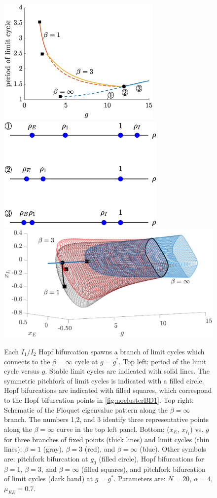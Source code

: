 \documentclass[reqno]{siamonline190516}
\begin{document}
\begin{figure}
    \centering
    \includegraphics[width=8cm]{periodvsg.eps}
    \includegraphics[width=8.2cm]{floquet1.eps}\\
    \hspace{-1cm}
    \includegraphics[width=17.25cm]{pitchbif.eps}
    \caption{Each $I_1/I_2$ Hopf bifurcation spawns a branch of limit cycles which connects to the $\beta=\infty$ cycle at $g=g^*$. Top left: period of the limit cycle versus $g$. Stable limit cycles are indicated with solid lines. The symmetric pitchfork of limit cycles is indicated with a filled circle. Hopf bifurcations are indicated with filled squares, which correspond to the Hopf bifurcation points in \cref{fig:noclusterBD1}. Top right: Schematic of the Floquet eigenvalue pattern along the $\beta = \infty$ branch. The numbers 1,2, and 3 identify three representative points along the $\beta=\infty$ curve in the top left panel. Bottom: ($x_E$, $x_{I_1}$) vs. $g$ for three branches of fixed points (thick lines) and limit cycles (thin lines): $\beta = 1$ (gray), $\beta=3$ (red), and $\beta=\infty$ (blue). Other symbols are: pitchfork bifurcation at $g_0$ (filled circle), Hopf bifurcations for $\beta = 1$, $\beta = 3$, and $\beta = \infty$ (filled squares), and pitchfork bifurcation of limit cycles (dark band) at $g = g^*$. Parameters are: $N = 20$,  $\alpha = 4$, $\mu_{EE} = 0.7$.}

\end{figure}
\end{document}
